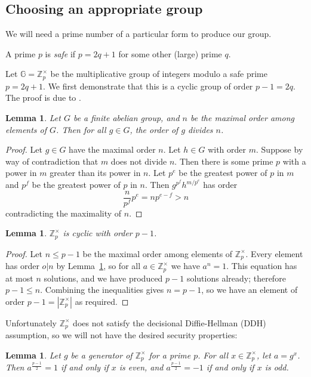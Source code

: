 \documentclass[11pt,twoside,a4paper]{article}
\newtheorem{lemma}[theorem]{Lemma}
\theoremstyle{definition}
\begin{document}
\subsection{Choosing an appropriate group}
We will need a prime number of a particular form to produce our group.
\begin{definition}
    A prime \(p\) is \textit{safe} if \(p=2q+1\) for some other (large) prime \(q\).
\end{definition}
Let \(\mathbb{G}=\mathbb{Z}^\times_p\) be the multiplicative group of integers modulo a safe prime \(p=2q+1\). We first demonstrate that this is a cyclic group of order \(p-1=2q\). The proof is due to \cite{cyclicity}.
\begin{lemma}\label{lem-order-divides}
    Let \(G\) be a finite abelian group, and \(n\) be the maximal order among elements of \(G\). Then for all \(g\in G\), the order of \(g\) divides \(n\).
\end{lemma}
\begin{proof}
    Let \(g\in G\) have the maximal order \(n\). Let \(h\in G\) with order \(m\). Suppose by way of contradiction that \(m\) does not divide \(n\). Then there is some prime \(p\) with a power in \(m\) greater than its power in \(n\). Let \(p^e\) be the greatest power of \(p\) in \(m\) and \(p^f\) be the greatest power of \(p\) in \(n\). Then \(g^{p^f}h^{m/p^e}\) has order
    \[\frac{n}{p^f}p^e=np^{e-f}>n\]
    contradicting the maximality of \(n\).
\end{proof}
\begin{lemma}
    \(\mathbb{Z}^\times_p\) is cyclic with order \(p-1\).
\end{lemma}
\begin{proof}
    Let \(n\leq p-1\) be the maximal order among elements of \(\mathbb{Z}^\times_p\). Every element has order \(o\vert n\) by Lemma~\ref{lem-order-divides}, so for all \(a\in\mathbb{Z}^\times_p\) we have \(a^n=1\). This equation has at most \(n\) solutions, and we have produced \(p-1\) solutions already; therefore \(p-1\leq n\).
    Combining the inequalities gives \(n=p-1\), so we have an element of order \(p-1=|\mathbb{Z}^\times_p|\) as required.
\end{proof}
Unfortunately \(\mathbb{Z}^\times_p\) does not satisfy the decisional Diffie-Hellman (DDH) assumption, so we will not have the desired security properties:
\begin{lemma}\label{lem-parity}
    Let \(g\) be a generator of \(\mathbb{Z}^\times_p\) for a prime \(p\). For all \(x\in\mathbb{Z}^\times_p\), let \(a=g^x\). Then \(a^{\frac{p-1}{2}} = 1\) if and only if \(x\) is even, and \(a^{\frac{p-1}{2}} = -1\) if and only if \(x\) is odd.
\end{lemma}
\end{document}
